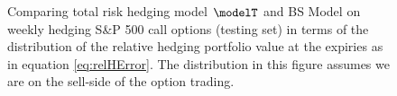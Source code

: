 \begin{figure}[htp!]
	\centering
	\caption{Comparing total risk hedging  model $\modelT$ and BS Model  on weekly hedging S\&P 500 call options (testing set) in terms of the distribution of the  relative hedging portfolio value at the expiries as in equation \eqref{eq:relHError}. The distribution in this figure assumes we are on the sell-side of the option trading.} 
	\label{fig:CallTotalW2}
	\centering

\end{figure}

